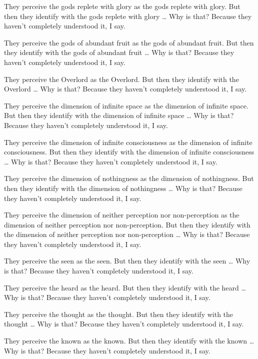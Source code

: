 \documentclass[12pt,openany]{book}%
\begin{document}
They perceive the gods replete with glory as the gods replete with glory. But then they identify with the gods replete with glory … Why is that? Because they haven’t completely understood it, I say. 

They perceive the gods of abundant fruit as the gods of abundant fruit. But then they identify with the gods of abundant fruit … Why is that? Because they haven’t completely understood it, I say. 

They perceive the Overlord as the Overlord. But then they identify with the Overlord … Why is that? Because they haven’t completely understood it, I say. 

They perceive the dimension of infinite space as the dimension of infinite space. But then they identify with the dimension of infinite space … Why is that? Because they haven’t completely understood it, I say. 

They perceive the dimension of infinite consciousness as the dimension of infinite consciousness. But then they identify with the dimension of infinite consciousness … Why is that? Because they haven’t completely understood it, I say. 

They perceive the dimension of nothingness as the dimension of nothingness. But then they identify with the dimension of nothingness … Why is that? Because they haven’t completely understood it, I say. 

They perceive the dimension of neither perception nor non-perception as the dimension of neither perception nor non-perception. But then they identify with the dimension of neither perception nor non-perception … Why is that? Because they haven’t completely understood it, I say. 

They perceive the seen as the seen. But then they identify with the seen … Why is that? Because they haven’t completely understood it, I say. 

They perceive the heard as the heard. But then they identify with the heard … Why is that? Because they haven’t completely understood it, I say. 

They perceive the thought as the thought. But then they identify with the thought … Why is that? Because they haven’t completely understood it, I say. 

They perceive the known as the known. But then they identify with the known … Why is that? Because they haven’t completely understood it, I say. 
\end{document}
